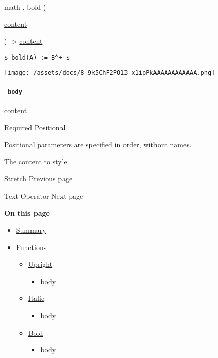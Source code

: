 math { . } { bold } (

{ \href{/docs/reference/foundations/content/}{content} }

) -\textgreater{} \href{/docs/reference/foundations/content/}{content}

\begin{verbatim}
$ bold(A) := B^+ $
\end{verbatim}

\texttt{[image: /assets/docs/8-9k5ChF2PO13\_x1ipPkAAAAAAAAAAAA.png]}

\paragraph{\texorpdfstring{\texttt{\ body\ }}{ body }}\label{functions-bold-body}

\href{/docs/reference/foundations/content/}{content}

{Required} {{ Positional }}

\label{functions-bold-body-positional-tooltip}
Positional parameters are specified in order, without names.

The content to style.

\href{/docs/reference/math/stretch/}{\pandocbounded{}}

{ Stretch } { Previous page }

\href{/docs/reference/math/op/}{\pandocbounded{}}

{ Text Operator } { Next page }

\textbf{On this page}

\begin{itemize}
\tightlist
\item
  \hyperref[summary]{Summary}
\item
  \hyperref[functions]{Functions}

  \begin{itemize}
  \tightlist
  \item
    \hyperref[functions-upright]{Upright}

    \begin{itemize}
    \tightlist
    \item
      \hyperref[functions-upright-body]{body}
    \end{itemize}
  \item
    \hyperref[functions-italic]{Italic}

    \begin{itemize}
    \tightlist
    \item
      \hyperref[functions-italic-body]{body}
    \end{itemize}
  \item
    \hyperref[functions-bold]{Bold}

    \begin{itemize}
    \tightlist
    \item
      \hyperref[functions-bold-body]{body}
    \end{itemize}
  \end{itemize}
\end{itemize}

